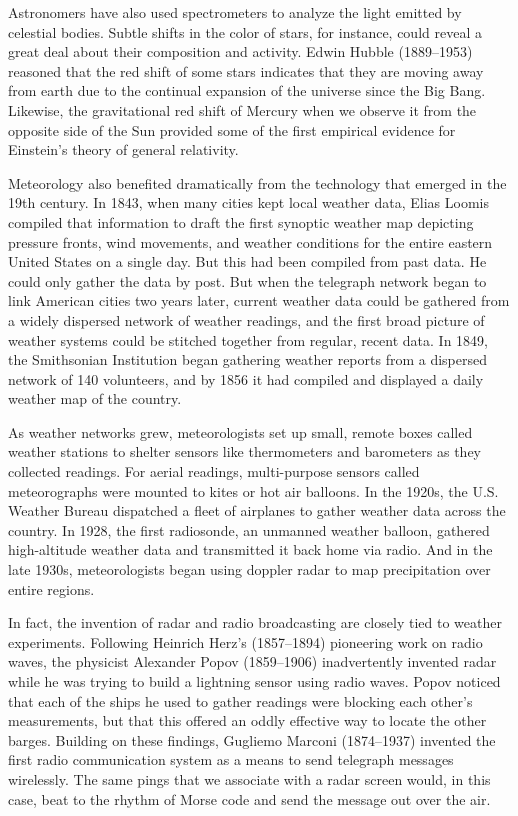 Astronomers have also used spectrometers to analyze the light emitted by
celestial bodies. Subtle shifts in the color of stars, for instance, could reveal a
great deal about their composition and activity. Edwin Hubble (1889–1953)
reasoned that the red shift of some stars indicates that they are moving
away from earth due to the continual expansion of the universe since the
Big Bang. Likewise, the gravitational red shift of Mercury when we observe
it from the opposite side of the Sun provided some of the first empirical
evidence for Einstein's theory of general relativity.

Meteorology also benefited dramatically from the technology that emerged
in the 19th century. In 1843, when many cities kept local weather data, Elias
Loomis compiled that information to draft the first synoptic weather map
depicting pressure fronts, wind movements, and weather conditions for the
entire eastern United States on a single day. But this had been compiled from
past data. He could only gather the data by post. But when the telegraph
network began to link American cities two years later, current weather data
could be gathered from a widely dispersed network of weather readings,
and the first broad picture of weather systems could be stitched together
from regular, recent data. In 1849, the Smithsonian Institution began gathering
weather reports from a dispersed network of 140 volunteers, and by
1856 it had compiled and displayed a daily weather map of the country.

As weather networks grew, meteorologists set up small, remote boxes called
weather stations to shelter sensors like thermometers and barometers as
they collected readings. For aerial readings, multi-purpose sensors called
meteorographs were mounted to kites or hot air balloons. In the 1920s, the
U.S. Weather Bureau dispatched a fleet of airplanes to gather weather data
across the country. In 1928, the first radiosonde, an unmanned weather balloon,
gathered high-altitude weather data and transmitted it back home via
radio. And in the late 1930s, meteorologists began using doppler radar to
map precipitation over entire regions.

In fact, the invention of radar and radio broadcasting are closely tied to
weather experiments. Following Heinrich Herz's (1857–1894) pioneering
work on radio waves, the physicist Alexander Popov (1859–1906) inadvertently
invented radar while he was trying to build a lightning sensor using
radio waves. Popov noticed that each of the ships he used to gather readings
were blocking each other's measurements, but that this offered an oddly
effective way to locate the other barges. Building on these findings, Gugliemo
Marconi (1874–1937) invented the first radio communication system
as a means to send telegraph messages wirelessly. The same pings that
we associate with a radar screen would, in this case, beat to the rhythm of
Morse code and send the message out over the air.

